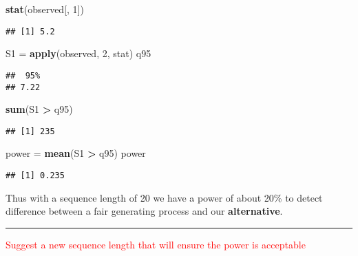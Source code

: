\documentclass[]{article}
\newenvironment{Shaded}{\begin{snugshade}}{\end{snugshade}}
\newcommand{\KeywordTok}[1]{\textcolor[rgb]{0.13,0.29,0.53}{\textbf{#1}}}
\newcommand{\DecValTok}[1]{\textcolor[rgb]{0.00,0.00,0.81}{#1}}
\newcommand{\StringTok}[1]{\textcolor[rgb]{0.31,0.60,0.02}{#1}}
\newcommand{\OperatorTok}[1]{\textcolor[rgb]{0.81,0.36,0.00}{\textbf{#1}}}
\newcommand{\NormalTok}[1]{#1}
\let\oldrule=\rule
\renewcommand{\rule}[1]{\oldrule{\linewidth}}
\begin{document}
\begin{Shaded}
\begin{Highlighting}[]
\KeywordTok{stat}\NormalTok{(observed[, }\DecValTok{1}\NormalTok{])}
\end{Highlighting}
\end{Shaded}

\begin{verbatim}
## [1] 5.2
\end{verbatim}

\begin{Shaded}
\begin{Highlighting}[]
\NormalTok{S1 =}\StringTok{ }\KeywordTok{apply}\NormalTok{(observed, }\DecValTok{2}\NormalTok{, stat)}
\NormalTok{q95}
\end{Highlighting}
\end{Shaded}

\begin{verbatim}
##  95% 
## 7.22
\end{verbatim}

\begin{Shaded}
\begin{Highlighting}[]
\KeywordTok{sum}\NormalTok{(S1 }\OperatorTok{>}\StringTok{ }\NormalTok{q95)}
\end{Highlighting}
\end{Shaded}

\begin{verbatim}
## [1] 235
\end{verbatim}

\begin{Shaded}
\begin{Highlighting}[]
\NormalTok{power =}\StringTok{ }\KeywordTok{mean}\NormalTok{(S1 }\OperatorTok{>}\StringTok{ }\NormalTok{q95)}
\NormalTok{power}
\end{Highlighting}
\end{Shaded}

\begin{verbatim}
## [1] 0.235
\end{verbatim}

Thus with a sequence length of 20 we have a power of about 20\% to
detect difference between a fair generating process and our
\textbf{alternative}.

\begin{center}\rule{0.5\linewidth}{\linethickness}\end{center}

\textcolor{red}{Suggest a new sequence length that will ensure the power is acceptable}
\end{document}

